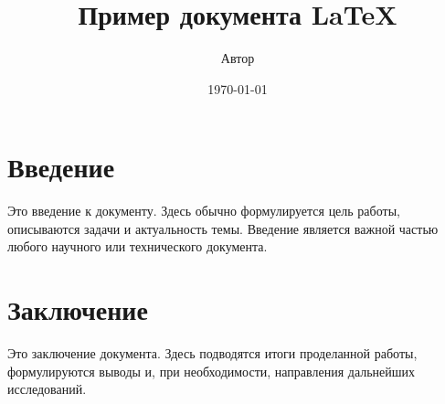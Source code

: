 \documentclass{article}
\title{Пример документа LaTeX}
\author{Автор}
\date{\today}
\begin{document}
\maketitle

\section{Введение}
Это введение к документу. Здесь обычно формулируется цель работы, описываются задачи и актуальность темы. Введение является важной частью любого научного или технического документа.

\section{Заключение}
Это заключение документа. Здесь подводятся итоги проделанной работы, формулируются выводы и, при необходимости, направления дальнейших исследований.
\end{document}
